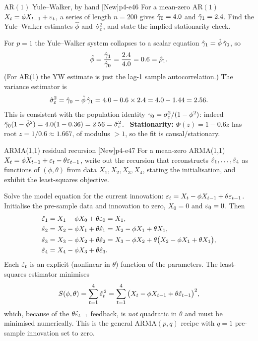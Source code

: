 \begin{exercise}{AR$(1)$ Yule--Walker, by hand \quad\textnormal{[New]}}{p4-e46}
For a mean-zero AR$(1)$ $X_t=\phi X_{t-1}+\varepsilon_t$, a series of length $n=200$
gives $\hat{\gamma}_0=4.0$ and $\hat{\gamma}_1=2.4$. Find the Yule--Walker estimates
$\hat\phi$ and $\hat\sigma_\varepsilon^2$, and state the implied stationarity check.
\end{exercise}
\begin{solution}
For $p=1$ the Yule--Walker system collapses to a scalar equation
$\hat{\gamma}_1=\hat\phi\,\hat{\gamma}_0$, so
\[
\hat\phi=\frac{\hat{\gamma}_1}{\hat{\gamma}_0}=\frac{2.4}{4.0}=0.6=\hat{\rho}_1 .
\]
(For AR(1) the YW estimate is just the lag-1 sample autocorrelation.) The
variance estimator is
\[
\hat\sigma_\varepsilon^2=\hat{\gamma}_0-\hat\phi\,\hat{\gamma}_1
=4.0-0.6\times2.4=4.0-1.44=2.56 .
\]
This is consistent with the population identity
$\gamma_0=\sigma_\varepsilon^2/(1-\phi^2)$: indeed
$\hat{\gamma}_0(1-\hat\phi^2)=4.0(1-0.36)=2.56=\hat\sigma_\varepsilon^2$.\ \checkmark\;
\textbf{Stationarity:} $\Phi(z)=1-0.6z$ has root $z=1/0.6\approx1.667$, of
modulus $>1$, so the fit is causal/stationary.
\end{solution}

\begin{exercise}{ARMA(1,1) residual recursion \quad\textnormal{[New]}}{p4-e47}
For a mean-zero ARMA(1,1) $X_t=\phi X_{t-1}+\varepsilon_t-\theta\varepsilon_{t-1}$, write out
the recursion that reconstructs $\hat{\varepsilon}_1,\dots,\hat{\varepsilon}_4$ as functions of
$(\phi,\theta)$ from data $X_1,X_2,X_3,X_4$, stating the initialisation, and
exhibit the least-squares objective.
\end{exercise}
\begin{solution}
Solve the model equation for the current innovation:
$\varepsilon_t=X_t-\phi X_{t-1}+\theta\varepsilon_{t-1}$. Initialise the pre-sample data and
innovation to zero, $X_0=0$ and $\varepsilon_0=0$. Then
\[
\begin{aligned}
\hat{\varepsilon}_1&=X_1-\phi X_0+\theta\varepsilon_0=X_1,\\
\hat{\varepsilon}_2&=X_2-\phi X_1+\theta\hat{\varepsilon}_1=X_2-\phi X_1+\theta X_1,\\
\hat{\varepsilon}_3&=X_3-\phi X_2+\theta\hat{\varepsilon}_2
            =X_3-\phi X_2+\theta\big(X_2-\phi X_1+\theta X_1\big),\\
\hat{\varepsilon}_4&=X_4-\phi X_3+\theta\hat{\varepsilon}_3 .
\end{aligned}
\]
Each $\hat{\varepsilon}_t$ is an explicit (nonlinear in $\theta$) function of the
parameters. The least-squares estimator minimises
\[
S(\phi,\theta)=\sum_{t=1}^4\hat{\varepsilon}_t^{\,2}
=\sum_{t=1}^4\big(X_t-\phi X_{t-1}+\theta\hat{\varepsilon}_{t-1}\big)^2 ,
\]
which, because of the $\theta\hat{\varepsilon}_{t-1}$ feedback, is \emph{not} quadratic
in $\theta$ and must be minimised numerically. This is the general
ARMA$(p,q)$ recipe with $q=1$ pre-sample innovation set to zero.
\end{solution}

